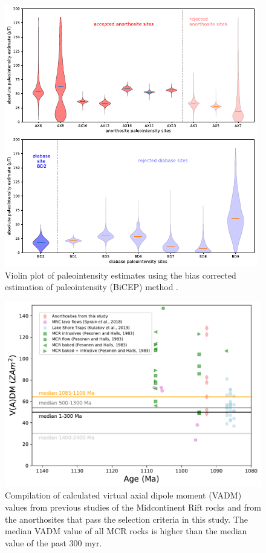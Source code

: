 \documentclass[draft]{agujournal2019}
\begin{document}
\begin{figure}[h!]
\noindent\includegraphics[width=\textwidth]{PINT_BiCEP.pdf}
\centering
\caption{\footnotesize{Violin plot of paleointensity estimates using the bias corrected estimation of paleointensity (BiCEP) method \cite{Cych2021a}. }}
\label{fig:BiCEP}
\end{figure}

\begin{figure}[h!]
\noindent\includegraphics[width=\textwidth]{MCR_VADM.pdf}
\centering
\caption{\footnotesize{Compilation of calculated virtual axial dipole moment (VADM) values from previous studies of the Midcontinent Rift rocks \cite{Pesonen1983a, Kulakov2013a, Sprain2018a} and from the anorthosites that pass the selection criteria in this study. The median VADM value of all MCR rocks is higher than the median value of the past 300 myr. }}
\label{fig:MCR_VADM}
\end{figure}
\end{document}
